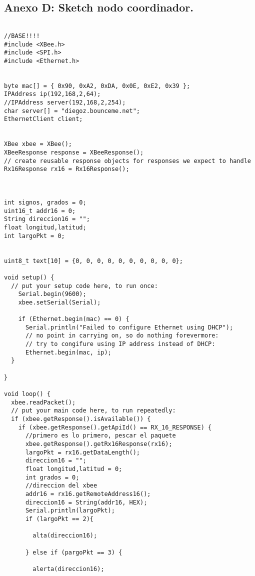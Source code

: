 \subsection*{Anexo D: Sketch nodo coordinador.}
\label{anexo-c}

\hbox{}

\begin{verbatim}

//BASE!!!!
#include <XBee.h>
#include <SPI.h>
#include <Ethernet.h>


byte mac[] = { 0x90, 0xA2, 0xDA, 0x0E, 0xE2, 0x39 };
IPAddress ip(192,168,2,64);
//IPAddress server(192,168,2,254);
char server[] = "diegoz.bounceme.net";
EthernetClient client;


XBee xbee = XBee();
XBeeResponse response = XBeeResponse();
// create reusable response objects for responses we expect to handle 
Rx16Response rx16 = Rx16Response();



int signos, grados = 0;
uint16_t addr16 = 0;
String direccion16 = "";
float longitud,latitud;
int largoPkt = 0;


uint8_t text[10] = {0, 0, 0, 0, 0, 0, 0, 0, 0, 0};

void setup() {
  // put your setup code here, to run once:
    Serial.begin(9600);
    xbee.setSerial(Serial);

    if (Ethernet.begin(mac) == 0) {
      Serial.println("Failed to configure Ethernet using DHCP");
      // no point in carrying on, so do nothing forevermore:
      // try to congifure using IP address instead of DHCP:
      Ethernet.begin(mac, ip);
  }

}

void loop() {
  xbee.readPacket();
  // put your main code here, to run repeatedly:
  if (xbee.getResponse().isAvailable()) {
    if (xbee.getResponse().getApiId() == RX_16_RESPONSE) {
      //primero es lo primero, pescar el paquete
      xbee.getResponse().getRx16Response(rx16);
      largoPkt = rx16.getDataLength();
      direccion16 = "";
      float longitud,latitud = 0;
      int grados = 0;
      //direccion del xbee
      addr16 = rx16.getRemoteAddress16();
      direccion16 = String(addr16, HEX);
      Serial.println(largoPkt);
      if (largoPkt == 2){

        alta(direccion16);

      } else if (pargoPkt == 3) {

        alerta(direccion16);


\end{verbatim}
